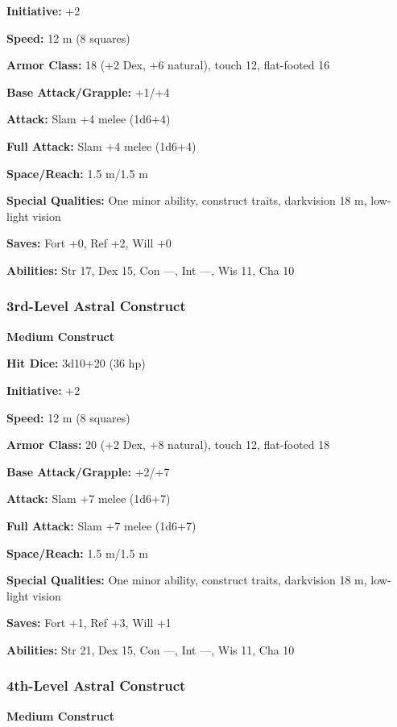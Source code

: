 {\begin{MonsterMiniStats}
	\textbf{Initiative:} +2

	\textbf{Speed:} 12 m (8 squares)

	\textbf{Armor Class:} 18 (+2 Dex, +6 natural), touch 12, flat-footed 16

	\textbf{Base Attack/Grapple:} +1/+4

	\textbf{Attack:} Slam +4 melee (1d6+4)

	\textbf{Full Attack:} Slam +4 melee (1d6+4)

	\textbf{Space/Reach:} 1.5 m/1.5 m

	\textbf{Special Qualities:} One minor ability, construct traits, darkvision 18 m, low-light vision

	\textbf{Saves:} Fort +0, Ref +2, Will +0

	\textbf{Abilities:} Str 17, Dex 15, Con ---, Int ---, Wis 11, Cha 10
	\end{MonsterMiniStats}

\subsubsection{3rd-Level Astral Construct}
	\begin{MonsterMiniStats}
	\textbf{Medium Construct}

	\textbf{Hit Dice:} 3d10+20 (36 hp)

	\textbf{Initiative:} +2

	\textbf{Speed:} 12 m (8 squares)

	\textbf{Armor Class:} 20 (+2 Dex, +8 natural), touch 12, flat-footed 18

	\textbf{Base Attack/Grapple:} +2/+7

	\textbf{Attack:} Slam +7 melee (1d6+7)

	\textbf{Full Attack:} Slam +7 melee (1d6+7)

	\textbf{Space/Reach:} 1.5 m/1.5 m

	\textbf{Special Qualities:} One minor ability, construct traits, darkvision 18 m, low-light vision

	\textbf{Saves:} Fort +1, Ref +3, Will +1

	\textbf{Abilities:} Str 21, Dex 15, Con ---, Int ---, Wis 11, Cha 10
	\end{MonsterMiniStats}

\subsubsection{4th-Level Astral Construct}
	\begin{MonsterMiniStats}
	\textbf{Medium Construct}


\end{MonsterMiniStats}}
